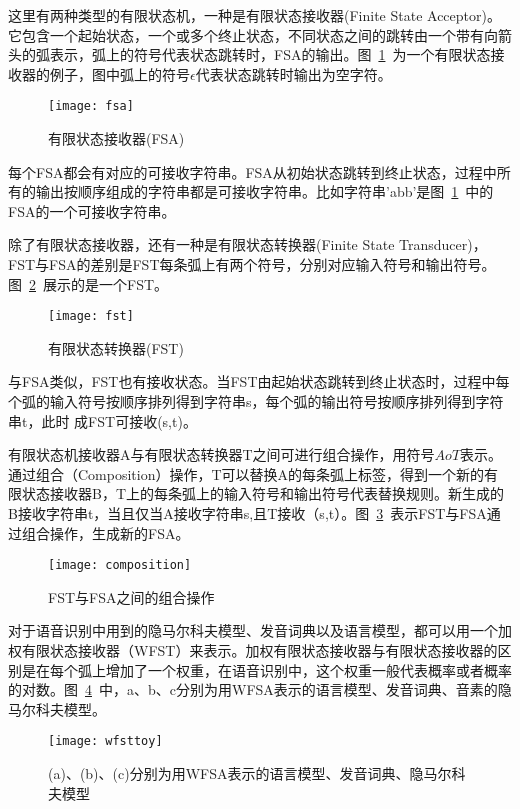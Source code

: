 这里有两种类型的有限状态机，一种是有限状态接收器(Finite State Acceptor)。它包含一个起始状态，一个或多个终止状态，不同状态之间的跳转由一个带有向箭头的弧表示，弧上的符号代表状态跳转时，FSA的输出。图~\ref{fig:fsa}~为一个有限状态接收器的例子，图中弧上的符号$\epsilon$代表状态跳转时输出为空字符。
\begin{figure}[htbp]
\centering
\texttt{[image: fsa]}
\caption{有限状态接收器(FSA)}\label{fig:fsa}
\vspace{\baselineskip}
\end{figure}

每个FSA都会有对应的可接收字符串。FSA从初始状态跳转到终止状态，过程中所有的输出按顺序组成的字符串都是可接收字符串。比如字符串'abb'是图~\ref{fig:fsa}~中的FSA的一个可接收字符串。

除了有限状态接收器，还有一种是有限状态转换器(Finite State Transducer)，FST与FSA的差别是FST每条弧上有两个符号，分别对应输入符号和输出符号。图~\ref{fig:fst}~展示的是一个FST。
\begin{figure}[htbp]
\centering
\texttt{[image: fst]}
\caption{有限状态转换器(FST)}\label{fig:fst}
\vspace{\baselineskip}
\end{figure}

与FSA类似，FST也有接收状态。当FST由起始状态跳转到终止状态时，过程中每个弧的输入符号按顺序排列得到字符串s，每个弧的输出符号按顺序排列得到字符串t，此时
成FST可接收(s,t)。

有限状态机接收器A与有限状态转换器T之间可进行组合操作，用符号$AoT$表示。通过组合（Composition）操作，T可以替换A的每条弧上标签，得到一个新的有限状态接收器B，T上的每条弧上的输入符号和输出符号代表替换规则。新生成的B接收字符串t，当且仅当A接收字符串s,且T接收（s,t）。图~\ref{fig:composition}~表示FST与FSA通过组合操作，生成新的FSA。
\begin{figure}[htbp]
\centering
\texttt{[image: composition]}
\caption{FST与FSA之间的组合操作}\label{fig:composition}
\vspace{\baselineskip}
\end{figure}

对于语音识别中用到的隐马尔科夫模型、发音词典以及语言模型，都可以用一个加权有限状态接收器（WFST）来表示。加权有限状态接收器与有限状态接收器的区别是在每个弧上增加了一个权重，在语音识别中，这个权重一般代表概率或者概率的对数。图~\ref{fig:wfsttoy}~中，a、b、c分别为用WFSA表示的语言模型、发音词典、音素的隐马尔科夫模型。
\begin{figure}[htbp]
\centering
\texttt{[image: wfsttoy]}
\caption{(a)、(b)、(c)分别为用WFSA表示的语言模型、发音词典、隐马尔科夫模型\cite{mohri2002weighted}}\label{fig:wfsttoy}
\vspace{\baselineskip}
\end{figure}

